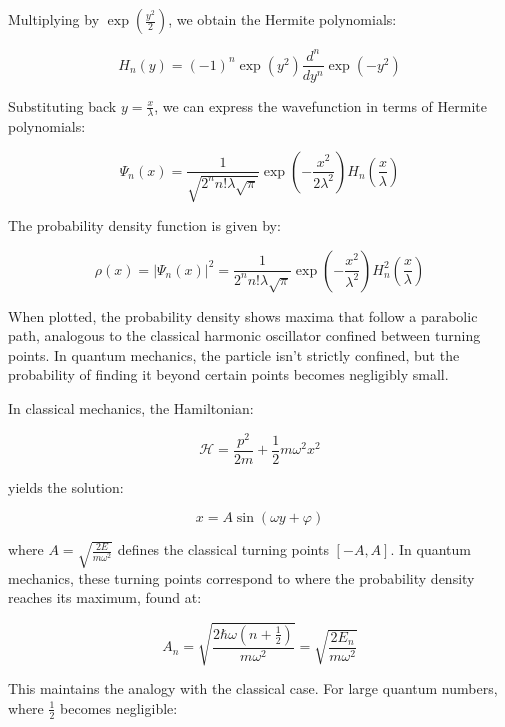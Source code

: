 \documentclass[italian]{HKNdocument}
\begin{document}
Multiplying by $\exp\left(\frac{y^2}{2}\right)$, we obtain the Hermite polynomials:

\begin{equation}
H_n(y) = (-1)^n\exp(y^2)\frac{d^n}{dy^n}\exp(-y^2)
\end{equation}

Substituting back $y=\frac{x}{\lambda}$, we can express the wavefunction in terms of Hermite polynomials:

\begin{equation}
\Psi_n(x) = \frac{1}{\sqrt{2^n n!\lambda\sqrt{\pi}}}\exp\left(-\frac{x^2}{2\lambda^2}\right)H_n\left(\frac{x}{\lambda}\right)
\end{equation}

The probability density function is given by:

\begin{equation}
\rho(x) = |\Psi_n(x)|^2 = \frac{1}{2^n n!\lambda\sqrt{\pi}}\exp\left(-\frac{x^2}{\lambda^2}\right)H_n^2\left(\frac{x}{\lambda}\right)
\end{equation}

When plotted, the probability density shows maxima that follow a parabolic path, analogous to the classical harmonic oscillator confined between turning points. In quantum mechanics, the particle isn't strictly confined, but the probability of finding it beyond certain points becomes negligibly small.

In classical mechanics, the Hamiltonian:

\begin{equation}
\mathcal{H} = \frac{p^2}{2m} + \frac{1}{2}m\omega^2 x^2
\end{equation}

yields the solution:

\begin{equation}
x = A\sin(\omega y + \varphi)
\end{equation}

where $A = \sqrt{\frac{2E}{m\omega^2}}$ defines the classical turning points $[-A,A]$. In quantum mechanics, these turning points correspond to where the probability density reaches its maximum, found at:

\begin{equation}
A_n = \sqrt{\frac{2\hbar\omega(n+\frac{1}{2})}{m\omega^2}} = \sqrt{\frac{2E_n}{m\omega^2}}
\end{equation}

This maintains the analogy with the classical case. For large quantum numbers, where $\frac{1}{2}$ becomes negligible:
\end{document}
